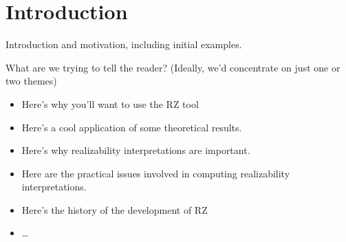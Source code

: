 \section{Introduction}
\label{sec:introduction}

Introduction and motivation, including initial examples.

What are we trying to tell the reader?  (Ideally, we'd concentrate on just one or two themes)
\begin{itemize}
\item Here's why you'll want to use the RZ tool
\item Here's a cool application of some theoretical results.
\item Here's why realizability interpretations
  are important.
\item Here are the practical issues involved in computing realizability
  interpretations.
\item Here's the history of the development of RZ
\item \ldots
\end{itemize}




